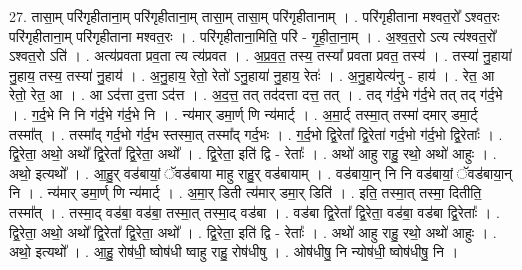 \documentclass[17pt]{extarticle}
\begin{document}
27. तासा॒म् परि॑गृहीताना॒म् परि॑गृहीताना॒म् तासा॒म् तासा॒म् परि॑गृहीतानाम् । . परि॑गृहीताना मश्वत॒रो᳚ ऽश्वत॒रः परि॑गृहीताना॒म् परि॑गृहीताना मश्वत॒रः । . परि॑गृहीताना॒मिति॒ परि॑ - गृ॒ही॒ता॒ना॒म् । . अ॒श्व॒त॒रो ऽत्य त्य॑श्वत॒रो᳚ ऽश्वत॒रो ऽति॑ । . अत्य॑प्रवता प्रव॒ता त्य त्य॑प्रवत । . अ॒प्र॒व॒त॒ तस्य॒ तस्या᳚ प्रवता प्रवत॒ तस्य॑ । . तस्या॑ नु॒हाया॑ नु॒हाय॒ तस्य॒ तस्या॑ नु॒हाय॑ । . अ॒नु॒हाय॒ रेतो॒ रेतो॑ ऽनु॒हाया॑ नु॒हाय॒ रेतः॑ । . अ॒नु॒हायेत्य॑नु - हाय॑ । . रेत॒ आ रेतो॒ रेत॒ आ । . आ ऽद॑त्ता द॒त्ता ऽद॑त्त । . अ॒द॒त्त॒ तत् तद॑दत्ता दत्त॒ तत् । . तद् ग॑र्द॒भे ग॑र्द॒भे तत् तद् ग॑र्द॒भे । . ग॒र्द॒भे नि नि ग॑र्द॒भे ग॑र्द॒भे नि । . न्य॑मार् डमा॒र्ण् णि न्य॑मार्ट् । . अ॒मा॒र्ट् तस्मा॒त् तस्मा॑ दमार् डमा॒र्ट् तस्मा᳚त् । . तस्मा᳚द् गर्द॒भो ग॑र्द॒भ स्तस्मा॒त् तस्मा᳚द् गर्द॒भः । . ग॒र्द॒भो द्वि॒रेता᳚ द्वि॒रेता॑ गर्द॒भो ग॑र्द॒भो द्वि॒रेताः᳚ । . द्वि॒रेता॒ अथो॒ अथो᳚ द्वि॒रेता᳚ द्वि॒रेता॒ अथो᳚ । . द्वि॒रेता॒ इति॑ द्वि - रेताः᳚ । . अथो॑ आहु राहु॒ रथो॒ अथो॑ आहुः । . अथो॒ इत्यथो᳚ । . आ॒हु॒र् वड॑बायां॒ ॅवड॑बाया माहु राहु॒र् वड॑बायाम् । . वड॑बाया॒न् नि नि वड॑बायां॒ ॅवड॑बाया॒न् नि । . न्य॑मार् डमा॒र्ण् णि न्य॑मार्ट् । . अ॒मा॒र् डिती त्य॑मार् डमा॒र् डिति॑ । . इति॒ तस्मा॒त् तस्मा॒ दितीति॒ तस्मा᳚त् । . तस्मा॒द् वड॑बा॒ वड॑बा॒ तस्मा॒त् तस्मा॒द् वड॑बा । . वड॑बा द्वि॒रेता᳚ द्वि॒रेता॒ वड॑बा॒ वड॑बा द्वि॒रेताः᳚ । . द्वि॒रेता॒ अथो॒ अथो᳚ द्वि॒रेता᳚ द्वि॒रेता॒ अथो᳚ । . द्वि॒रेता॒ इति॑ द्वि - रेताः᳚ । . अथो॑ आहु राहु॒ रथो॒ अथो॑ आहुः । . अथो॒ इत्यथो᳚ । . आ॒हु॒ रोष॑धी॒ ष्वोष॑धी ष्वाहु राहु॒ रोष॑धीषु । . ओष॑धीषु॒ नि न्योष॑धी॒ ष्वोष॑धीषु॒ नि । \newline
\end{document}
